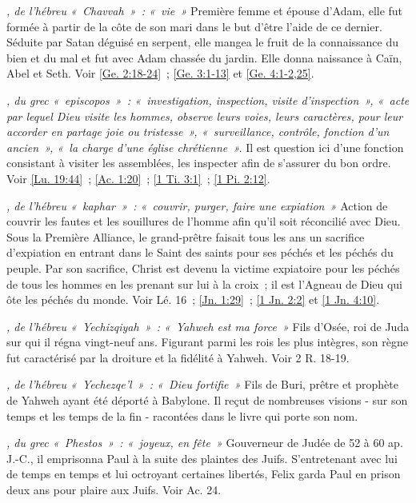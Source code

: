 \begin{multicols}{2}
\textit{, de l'hébreu «~Chavvah~»~: «~vie~»}\newline
Première femme et épouse d'Adam, elle fut formée à partir de la côte de son mari dans le but d'être l'aide de ce dernier. Séduite par Satan déguisé en serpent, elle mangea le fruit de la connaissance du bien et du mal et fut avec Adam chassée du jardin. Elle donna naissance à Caïn, Abel et Seth. Voir \vref{Ge. 2:18-24}~; \vref{Ge. 3:1-13} et \vref{Ge. 4:1-2,25}.

\textit{, du grec «~episcopos~»~: «~investigation, inspection, visite d'inspection~», «~acte par lequel Dieu visite les hommes, observe leurs voies, leurs caractères, pour leur accorder en partage joie ou tristesse~», «~surveillance, contrôle, fonction d'un ancien~», «~la charge d'une église chrétienne~».}\newline
Il est question ici d'une fonction consistant à visiter les assemblées, les inspecter afin de s'assurer du bon ordre. Voir \vref{Lu. 19:44}~; \vref{Ac. 1:20}~; \vref{1 Ti. 3:1}~; \vref{1 Pi. 2:12}.

\textit{, de l'hébreu «~kaphar~»~: «~couvrir, purger, faire une expiation~»}\newline
Action de couvrir les fautes et les souillures de l'homme afin qu'il soit réconcilié avec Dieu. Sous la Première Alliance, le grand-prêtre faisait tous les ans un sacrifice d'expiation en entrant dans le Saint des saints pour ses péchés et les péchés du peuple. Par son sacrifice, Christ est devenu la victime expiatoire pour les péchés de tous les hommes en les prenant sur lui à la croix~; il est l'Agneau de Dieu qui ôte les péchés du monde. Voir Lé. 16~; \vref{Jn. 1:29}~; \vref{1 Jn. 2:2} et \vref{1 Jn. 4:10}.

\textit{, de l'hébreu «~Yechizqiyah~»~: «~Yahweh est ma force~»}\newline
Fils d'Osée, roi de Juda sur qui il régna vingt-neuf ans. Figurant parmi les rois les plus intègres, son règne fut caractérisé par la droiture et la fidélité à Yahweh. Voir 2 R. 18-19.

\textit{, de l'hébreu «~Yechezqe'l~»~: «~Dieu fortifie~»}\newline
Fils de Buri, prêtre et prophète de Yahweh ayant été déporté à Babylone. Il reçut de nombreuses visions - sur son temps et les temps de la fin - racontées dans le livre qui porte son nom.

\textit{, du grec «~Phestos~»~: «~joyeux, en fête~»}\newline
Gouverneur de Judée de 52 à 60 ap. J.-C., il emprisonna Paul à la suite des plaintes des Juifs. S'entretenant avec lui de temps en temps et lui octroyant certaines libertés, Felix garda Paul en prison deux ans pour plaire aux Juifs. Voir Ac. 24.


\end{multicols}
